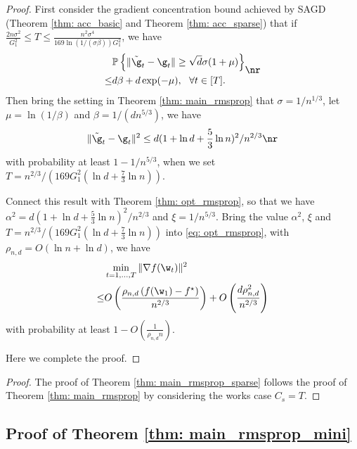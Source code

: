 \begin{proof}
First consider the gradient concentration bound achieved by SAGD (Theorem \ref{thm: acc_basic} and Theorem \ref{thm: acc_sparse}) that if $ \frac{2n\sigma^2}{G_1^2}\leq T \leq \frac{n^2 \sigma^4}{169 \ln(1/(\sigma \beta))G_1^2}$, we have 
\begin{equation}
\begin{split}
&\mathbb{P}\left\{\|\tilde \g_t - \g_t\| \geq \sqrt{d}\sigma(1+\mu)\right\} \\ 
\leq& d\beta + d\exp(-\mu), \ \ \forall t \in [T].
\end{split} \nr
\end{equation}
Then bring the setting in Theorem \ref{thm: main_rmsprop} that $\sigma = 1/n^{1/3}$, let $\mu = \ln (1/\beta)$ and $\beta = 1/(d n^{5/3})$, we have
\begin{equation}
 \|\tilde \g_t - \g_t\|^2 \leq d(1+\ln d + \frac{5}{3}\ln n)^2/n^{2/3}    \nr
\end{equation}
with probability at least $1- 1/n^{5/3}$, when we set $T = n^{2/3}/\left(169G_1^2(\ln d + \frac{7}{3}\ln n)\right)$. 

Connect this result with Theorem \ref{thm: opt_rmsprop}, so that we have $\alpha^2 = d(1+\ln d + \frac{5}{3}\ln n)^2/n^{2/3}$ and $\xi = 1/n^{5/3}$. Bring the value $\alpha^2$, $\xi$ and $T = n^{2/3}/\left(169G_1^2(\ln d + \frac{7}{3}\ln n)\right)$ into \eqref{eq: opt_rmsprop}, with $\rho_{n,d} = O \left(\ln n + \ln d \right)$, we have
\begin{align*}
 &\min_{t = 1,..., T}\|\nabla f(\w_t)\|^2\\ 
 \leq& O\left( \frac{\rho_{n,d} \left(f(\w_1) - f^\star \right)}{n^{2/3}} \right) + O \left( \frac{d \rho_{n,d}^2}{n^{2/3}}\right)
\end{align*}
with probability at least $1-O\left(\frac{1}{\rho_{n,d} n}\right)$.

Here we complete the proof.

\end{proof}


\theormspropsparse*


\begin{proof}
The proof of 
Theorem \ref{thm: main_rmsprop_sparse} follows the proof of Theorem \ref{thm: main_rmsprop} by considering the works case $C_{s} = T$.
\end{proof}


\subsection{Proof of Theorem \ref{thm: main_rmsprop_mini}} 

